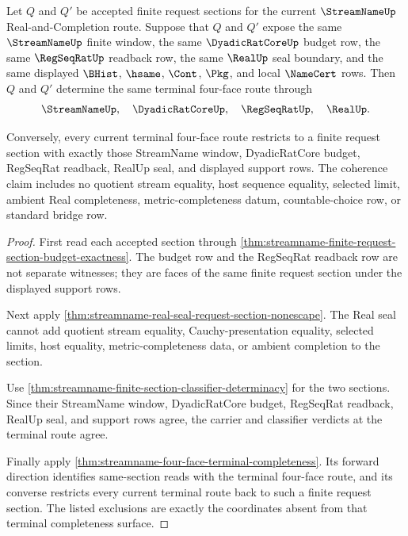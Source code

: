 \begin{theorem}
\label{thm:streamname-finite-request-section-terminal-coherence}
Let $Q$ and $Q'$ be accepted finite request sections for the current
$\StreamNameUp$ Real-and-Completion route. Suppose that $Q$ and $Q'$ expose
the same $\StreamNameUp$ finite window, the same $\DyadicRatCoreUp$ budget
row, the same $\RegSeqRatUp$ readback row, the same $\RealUp$ seal boundary,
and the same displayed $\BHist$, $\hsame$, $\Cont$, $\Pkg$, and local
$\NameCert$ rows. Then $Q$ and $Q'$ determine the same terminal four-face
route through
$$
\StreamNameUp,\quad \DyadicRatCoreUp,\quad \RegSeqRatUp,\quad \RealUp.
$$

Conversely, every current terminal four-face route restricts to a finite
request section with exactly those StreamName window, DyadicRatCore budget,
RegSeqRat readback, RealUp seal, and displayed support rows. The coherence
claim includes no quotient stream equality, host sequence equality, selected
limit, ambient Real completeness, metric-completeness datum, countable-choice
row, or standard bridge row.
\end{theorem}
\begin{proof}
First read each accepted section through
\autoref{thm:streamname-finite-request-section-budget-exactness}. The budget
row and the RegSeqRat readback row are not separate witnesses; they are faces
of the same finite request section under the displayed support rows.

Next apply
\autoref{thm:streamname-real-seal-request-section-nonescape}. The Real seal
cannot add quotient stream equality, Cauchy-presentation equality, selected
limits, host equality, metric-completeness data, or ambient completion to the
section.

Use \autoref{thm:streamname-finite-section-classifier-determinacy} for the
two sections. Since their StreamName window, DyadicRatCore budget, RegSeqRat
readback, RealUp seal, and support rows agree, the carrier and classifier
verdicts at the terminal route agree.

Finally apply \autoref{thm:streamname-four-face-terminal-completeness}. Its
forward direction identifies same-section reads with the terminal four-face
route, and its converse restricts every current terminal route back to such a
finite request section. The listed exclusions are exactly the coordinates
absent from that terminal completeness surface.
\end{proof}

